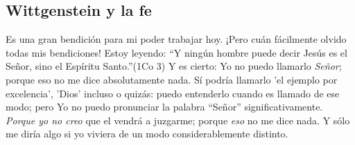 
\subsection{Wittgenstein y la fe}

\begin{revision}
Es una gran bendición para mi poder trabajar hoy. ¡Pero cuán fácilmente olvido
todas mis bendiciones!
Estoy leyendo: ``Y ningún hombre puede decir Jesús es el Señor, sino el Espíritu
Santo.''(1Co 3) Y es cierto: Yo no puedo llamarlo \emph{Señor}; porque eso no me
dice absolutamente nada. Sí podría llamarlo 'el ejemplo por excelencia', 'Dios'
incluso o quizás: puedo entenderlo cuando es llamado de ese modo; pero Yo no
puedo pronunciar la palabra ``Señor'' significativamente. \emph{Porque yo no
creo} que el vendrá a juzgarme; porque \emph{eso} no me dice nada. Y sólo me
diría algo si yo viviera de un modo considerablemente distinto.


\end{revision}
